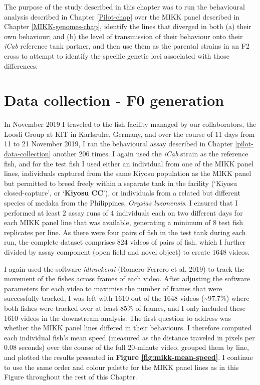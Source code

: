 \documentclass[
]{book}
\begin{document}
The purpose of the study described in this chapter was to run the behavioural analysis described in Chapter \ref{Pilot-chap} over the MIKK panel described in Chapter \ref{MIKK-genomes-chap}, identify the lines that diverged in both (a) their own behaviour; and (b) the level of transmission of their behaviour onto their \emph{\textcolor{iCab_424B4D}{iCab}} reference tank partner, and then use them as the parental strains in an F2 cross to attempt to identify the specific genetic loci associated with those differences.

\hypertarget{data-collection---f0-generation}{%
\section{Data collection - F0 generation}\label{data-collection---f0-generation}}

In November 2019 I traveled to the fish facility managed by our collaborators, the Loosli Group at KIT in Karlsruhe, Germany, and over the course of 11 days from 11 to 21 November 2019, I ran the behavioural assay described in Chapter \ref{pilot-data-collection} another 206 times. I again used the \emph{\textcolor{iCab_424B4D}{iCab}} strain as the reference fish, and for the test fish I used either an individual from one of the MIKK panel lines, individuals captured from the same Kiyosu population as the MIKK panel but permitted to breed freely within a separate tank in the facility (`Kiyosu closed-capture', or `\textbf{Kiyosu CC}'), or individuals from a related but different species of medaka from the Philippines, \emph{Oryzias luzonensis}. I ensured that I performed at least 2 assay runs of 4 individuals each on two different days for each MIKK panel line that was available, generating a minimum of 8 test fish replicates per line. As there were four pairs of fish in the test tank during each run, the complete dataset comprises 824 videos of pairs of fish, which I further divided by assay component (open field and novel object) to create 1648 videos.

I again used the software \emph{idtrackerai} (Romero-Ferrero et al. 2019) to track the movement of the fishes across frames of each video. After adjusting the software parameters for each video to maximise the number of frames that were successfully tracked, I was left with 1610 out of the 1648 videos (\textasciitilde97.7\%) where both fishes were tracked over at least 85\% of frames, and I only included these 1610 videos in the downstream analysis. The first question to address was whether the MIKK panel lines differed in their behaviours. I therefore computed each individual fish's mean speed (measured as the distance traveled in pixels per 0.08 seconds) over the course of the full 20-minute video, grouped them by line, and plotted the results presented in \textbf{Figure \ref{fig:mikk-mean-speed}}. I continue to use the same order and colour palette for the MIKK panel lines as in this Figure throughout the rest of this Chapter.
\end{document}
